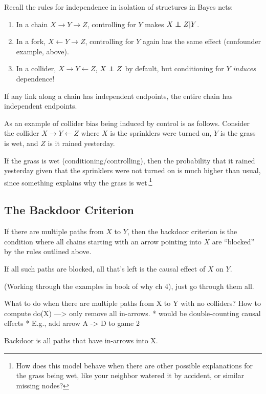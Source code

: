 \documentclass{article}
\begin{document}
Recall the rules for independence in isolation of structures in Bayes nets:

\begin{enumerate}
\item In a chain $X\rightarrow Y \rightarrow Z$, controlling for $Y$ makes $X\independent Z|Y$.
\item In a fork, $X\leftarrow Y \rightarrow Z$, controlling for $Y$ again has the same effect (confounder example, above).
\item In a collider, $X\rightarrow Y\leftarrow Z$, $X\independent Z$ by default, but conditioning for $Y$ \textit{induces} dependence!
\end{enumerate}

If any link along a chain has independent endpoints, the entire chain has independent endpoints.

As an example of collider bias being induced by control is as follows. Consider the collider $X\rightarrow Y\leftarrow Z$ where $X$ is the sprinklers were turned on, $Y$ is the grass is wet, and $Z$ is it rained yesterday.

If the grass is wet (conditioning/controlling), then the probability that it rained yesterday given that the sprinklers were not turned on is much higher than usual, since something explains why the grass is wet.\footnote{How does this model behave when there are other possible explanations for the grass being wet, like your neighbor watered it by accident, or similar missing nodes?}

\subsection{The Backdoor Criterion}

If there are multiple paths from $X$ to $Y$, then the backdoor criterion is the condition where all chains starting with an arrow pointing into $X$ are ``blocked'' by the rules outlined above.

If all such paths are blocked, all that's left is the causal effect of $X$ on $Y$.


(Working through the examples in book of why ch 4), just go through them all.

What to do when there are multiple paths from X to Y with no colliders? How to compute do(X) ---> only remove all in-arrows.
* would be double-counting causal effects
* E.g., add arrow A -> D to game 2

Backdoor is all paths that have in-arrows into X.
\end{document}
